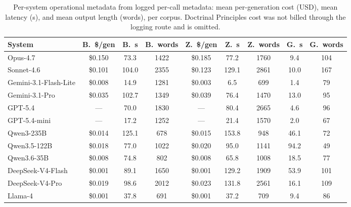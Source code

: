 \begin{table}[t]
\centering\footnotesize
\caption{Per-system operational metadata from logged per-call metadata: mean per-generation cost (USD), mean latency (s), and mean output length (words), per corpus. Doctrinal Principles cost was not billed through the logging route and is omitted.}
\label{tbl-operational}
\setlength{\tabcolsep}{4pt}
\begin{tabular*}{\textwidth}{@{\extracolsep{\fill}}lcccccccc@{}}
\toprule
System & B.~\$/gen & B.~s & B.~words & Z.~\$/gen & Z.~s & Z.~words & G.~s & G.~words \\
\midrule
Opus-4.7 & \$0.150 & 73.3 & 1422 & \$0.185 & 77.2 & 1760 & 9.4 & 104 \\
Sonnet-4.6 & \$0.101 & 104.0 & 2355 & \$0.123 & 129.1 & 2861 & 10.0 & 167 \\
Gemini-3.1-Flash-Lite & \$0.008 & 14.9 & 1281 & \$0.003 & 6.5 & 699 & 1.4 & 79 \\
Gemini-3.1-Pro & \$0.035 & 102.7 & 1349 & \$0.039 & 76.4 & 1470 & 13.0 & 95 \\
GPT-5.4 & — & 70.0 & 1830 & — & 80.4 & 2665 & 4.6 & 96 \\
GPT-5.4-mini & — & 17.2 & 1252 & — & 21.4 & 1570 & 2.0 & 67 \\
Qwen3-235B & \$0.014 & 125.1 & 678 & \$0.015 & 153.8 & 948 & 46.1 & 72 \\
Qwen3.5-122B & \$0.018 & 77.0 & 1022 & \$0.020 & 95.0 & 1141 & 94.2 & 49 \\
Qwen3.6-35B & \$0.008 & 74.8 & 802 & \$0.008 & 65.8 & 1008 & 18.5 & 77 \\
DeepSeek-V4-Flash & \$0.001 & 89.1 & 1650 & \$0.001 & 129.2 & 1909 & 53.9 & 101 \\
DeepSeek-V4-Pro & \$0.019 & 98.6 & 2012 & \$0.023 & 131.8 & 2561 & 16.1 & 109 \\
Llama-4 & \$0.001 & 37.8 & 691 & \$0.001 & 37.2 & 709 & 9.4 & 86 \\
\bottomrule
\end{tabular*}
\end{table}

